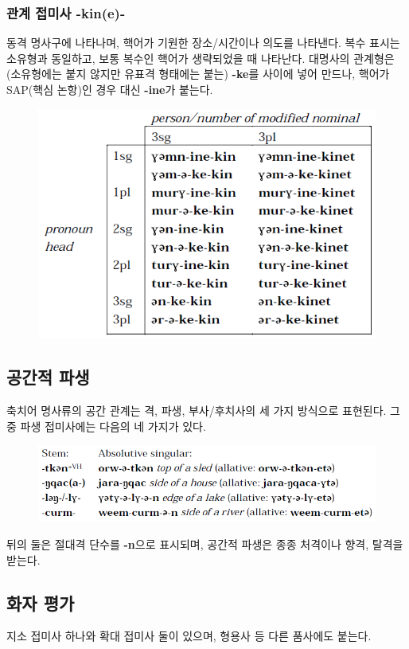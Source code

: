 \subsubsection{관계 접미사 -kin(e)-}
동격 명사구에 나타나며, 핵어가 기원한 장소/시간이나 의도를 나타낸다. 복수 표시는 소유형과 동일하고, 보통 복수인 핵어가 생략되었을 때 나타난다. 대명사의 관계형은 (소유형에는 붙지 않지만 유표격 형태에는 붙는) \textbf{-ke}를 사이에 넣어 만드나, 핵어가 SAP(핵심 논항)인 경우 대신 \textbf{-ine}가 붙는다.
\begin{figure}[H]
\centerline{\includegraphics{Chukchi/src/chre.png}}
\end{figure}
\subsection{공간적 파생}
축치어 명사류의 공간 관계는 격, 파생, 부사/후치사의 세 가지 방식으로 표현된다. 그중 파생 접미사에는 다음의 네 가지가 있다.
\begin{figure}[H]
\centerline{\includegraphics{Chukchi/src/chsp.png}}
\end{figure}
뒤의 둘은 절대격 단수를 \textbf{-n}으로 표시되며, 공간적 파생은 종종 처격이나 향격, 탈격을 받는다. 
\subsection{화자 평가}
지소 접미사 하나와 확대 접미사 둘이 있으며, 형용사 등 다른 품사에도 붙는다.
